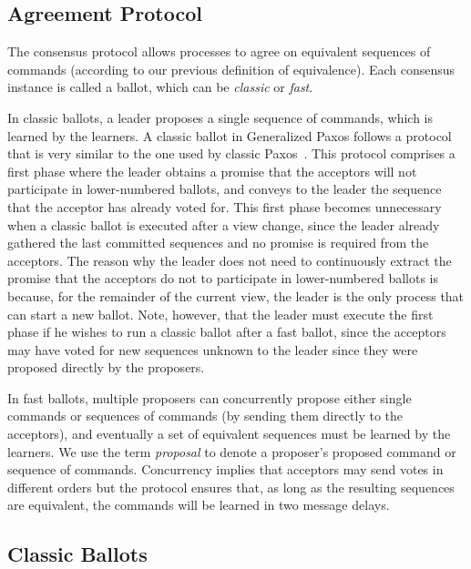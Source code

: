 \subsection{Agreement Protocol} 

The consensus protocol allows processes to agree on equivalent sequences of commands (according to our previous definition of equivalence). Each consensus instance is called a ballot, which can be \textit{classic} or \textit{fast}. 

In classic ballots, a leader proposes a single sequence of commands, which is learned by the learners. 
A classic ballot in Generalized Paxos follows a protocol that is very similar to the one used by classic Paxos~\cite{paxos}. This protocol comprises a first phase where the leader obtains a promise that the acceptors will not participate in lower-numbered ballots, and conveys to the leader the sequence that the acceptor has already voted for. This first phase becomes unnecessary when a classic ballot is executed after a view change, since the leader already gathered the last committed sequences and no promise is required from the acceptors. The reason why the leader does not need to continuously extract the promise that the acceptors do not to participate in lower-numbered ballots is because, for the remainder of the current view, the leader is the only process that can start a new ballot. Note, however, that the leader must execute the first phase if he wishes to run a classic ballot after a fast ballot, since the acceptors may have voted for new sequences unknown to the leader since they were proposed directly by the proposers.

In fast ballots, multiple proposers can concurrently propose either single commands or sequences of commands (by sending them directly to the acceptors), and eventually a set of equivalent sequences must be learned by the learners. We use the term \textit{proposal} to denote a proposer's proposed command or sequence of commands. 
Concurrency implies that acceptors may send votes in different orders but the protocol ensures that, as long as the resulting sequences are equivalent, the commands will be learned in two message delays. 

\subsection{Classic Ballots} 

